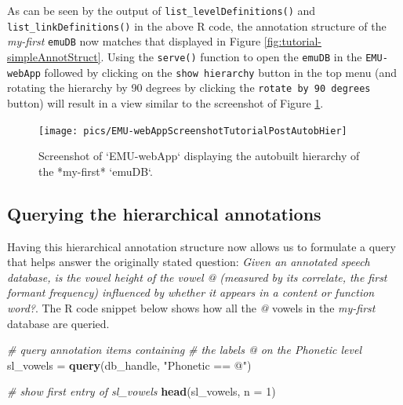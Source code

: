 \documentclass[]{book}
\newenvironment{Shaded}{\begin{snugshade}}{\end{snugshade}}
\newcommand{\CommentTok}[1]{\textcolor[rgb]{0.56,0.35,0.01}{\textit{#1}}}
\newcommand{\DataTypeTok}[1]{\textcolor[rgb]{0.13,0.29,0.53}{#1}}
\newcommand{\DecValTok}[1]{\textcolor[rgb]{0.00,0.00,0.81}{#1}}
\newcommand{\KeywordTok}[1]{\textcolor[rgb]{0.13,0.29,0.53}{\textbf{#1}}}
\newcommand{\NormalTok}[1]{#1}
\newcommand{\StringTok}[1]{\textcolor[rgb]{0.31,0.60,0.02}{#1}}
\begin{document}
As can be seen by the output of \texttt{list\_levelDefinitions()} and \texttt{list\_linkDefinitions()} in the above R code, the annotation structure of the \emph{my-first} \texttt{emuDB} now matches that displayed in Figure \ref{fig:tutorial-simpleAnnotStruct}. Using the \texttt{serve()} function to open the \texttt{emuDB} in the \texttt{EMU-webApp} followed by clicking on the \texttt{show\ hierarchy} button in the top menu (and rotating the hierarchy by 90 degrees by clicking the \texttt{rotate\ by\ 90\ degrees} button) will result in a view similar to the screenshot of Figure \ref{fig:tutorial-EMU-webAppScreenshotTutorialPostAutobHier}.

\begin{figure}

{\centering \texttt{[image: pics/EMU-webAppScreenshotTutorialPostAutobHier]} 

}

\caption{Screenshot of `EMU-webApp` displaying the autobuilt hierarchy of the *my-first* `emuDB`.}\label{fig:tutorial-EMU-webAppScreenshotTutorialPostAutobHier}
\end{figure}

\hypertarget{querying-the-hierarchical-annotations}{%
\subsection{Querying the hierarchical annotations}\label{querying-the-hierarchical-annotations}}

Having this hierarchical annotation structure now allows us to formulate a query that helps answer the originally stated question: \emph{Given an annotated speech database, is the vowel height of the vowel @ (measured by its correlate, the first formant frequency) influenced by whether it appears in a content or function word?}. The R code snippet below shows how all the \emph{@} vowels in the \emph{my-first} database are queried.

\begin{Shaded}
\begin{Highlighting}[]
\CommentTok{# query annotation items containing}
\CommentTok{# the labels @ on the Phonetic level}
\NormalTok{sl_vowels =}\StringTok{ }\KeywordTok{query}\NormalTok{(db_handle, }\StringTok{"Phonetic == @"}\NormalTok{)}

\CommentTok{# show first entry of sl_vowels}
\KeywordTok{head}\NormalTok{(sl_vowels, }\DataTypeTok{n =} \DecValTok{1}\NormalTok{)}
\end{Highlighting}
\end{Shaded}
\end{document}

